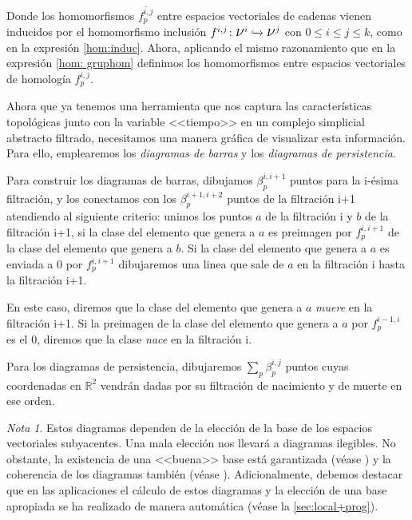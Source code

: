 \documentclass[12pt, a4paper, twoside]{book}
\numberwithin{equation}{section}
\theoremstyle{definition}
\theoremstyle{remark}
\newtheorem*{remark}{Nota}
\theoremstyle{plain}
\begin{document}
	Donde los homomorfismos $\overline{f_{p}^{i,j}}$ entre espacios 
	vectoriales de 
	cadenas vienen inducidos por el homomorfismo inclusión $f^{i,j}\colon 
	\text{{\Large $\nu$}$^{i}$} \xhookrightarrow{} 
	\text{{\Large $\nu$}$^{j}$}$ con $0\leq i \leq j \leq k$, como en la 
	expresión
	\ref{hom:induc}. Ahora, aplicando el mismo razonamiento que en la 
	expresión 
	\ref{hom: gruphom} definimos los homomorfismos entre espacios 
	vectoriales de 
	homología $f^{i,j}_{p}$.

	Ahora que ya tenemos una herramienta que nos captura las 
	características topológicas junto con la variable <<tiempo>> en un 
	complejo simplicial abstracto filtrado, necesitamos una manera gráfica 
	de visualizar esta información. Para ello, emplearemos los  
	\emph{diagramas de barras} y los \emph{diagramas de persistencia}.
	
	Para construir los diagramas de barras, dibujamos $\beta_{p}^{i,i+1}$ 
	puntos para la i-ésima filtración, y los conectamos con los 
	$\beta_{p}^{i+1,i+2}$ puntos de la filtración i+1 atendiendo al 
	siguiente criterio: unimos los puntos $a$ de la filtración i y $b$ de
	la filtración i+1, si la clase del elemento que genera a $a$ es 
	preimagen por $f_{p}^{i,i+1}$ de la clase del elemento que genera a 
	$b$. Si la clase del elemento que genera a $a$ es enviada a 0 por 
	$f_{p}^{i,i+1}$ dibujaremos una linea que sale de $a$ en la filtración
	i hasta la filtración i+1. 

	En este caso, diremos que la clase del 
	elemento que genera a $a$ \emph{muere} en la filtración i+1. Si la 
	preimagen de la clase del elemento que genera a $a$ por 
	$f_{p}^{i-1,i}$ es el 0, diremos que la clase \emph{nace} en la 
	filtración i.

	Para los diagramas de persistencia, dibujaremos $\sum_{p}
	\beta_{p}^{i,j}$ puntos cuyas coordenadas en $\mathbb{R}^{2}$ vendrán 
	dadas por su filtración de nacimiento y de muerte en ese orden. 

	\begin{remark}
		Estos diagramas dependen de la elección de la base de los 
		espacios vectoriales subyacentes. Una mala elección nos 
		llevará a diagramas ilegibles. No obstante, la existencia de 
		una <<buena>> base está garantizada (véase 
		\cite{BaseDiagExt-Carlsson}) y la 
		coherencia de los diagramas también (véase 
		\cite{BaseDiag-Cavanna}). Adicionalmente, debemos destacar que
		en las aplicaciones el cálculo de estos diagramas y la 
		elección de una base apropiada se ha 
		realizado de manera automática (véase la
		\autoref{sec:local+prog}). 
	\end{remark}
\end{document}
